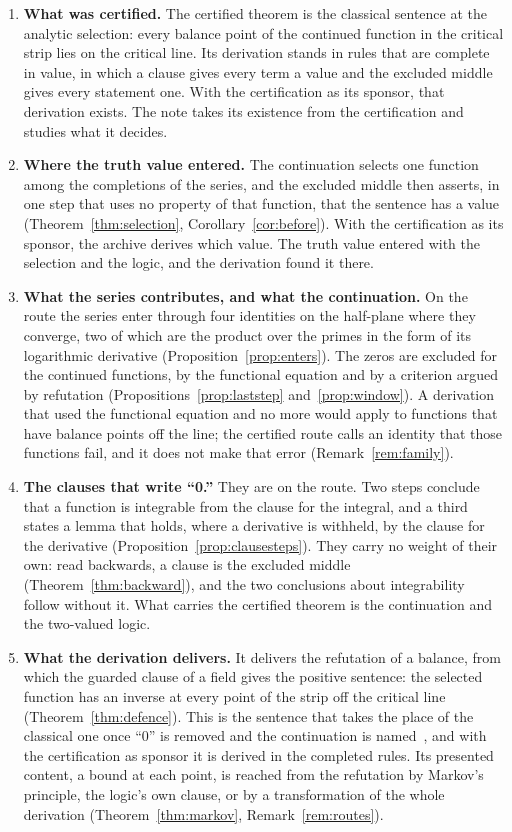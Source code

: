 \documentclass[11pt]{article}
\theoremstyle{definition}
\theoremstyle{remark}
\begin{document}
\begin{enumerate}[leftmargin=2em,itemsep=4pt]
\item \textbf{What was certified.} The certified theorem is the classical sentence at the analytic selection: every balance point of the continued function in the critical strip lies on the critical line. Its derivation stands in rules that are complete in value, in which a clause gives every term a value and the excluded middle gives every statement one. With the certification as its sponsor, that derivation exists. The note takes its existence from the certification and studies what it decides.

\item \textbf{Where the truth value entered.} The continuation selects one function among the completions of the series, and the excluded middle then asserts, in one step that uses no property of that function, that the sentence has a value (Theorem~\ref{thm:selection}, Corollary~\ref{cor:before}). With the certification as its sponsor, the archive derives which value. The truth value entered with the selection and the logic, and the derivation found it there.

\item \textbf{What the series contributes, and what the continuation.} On the route the series enter through four identities on the half-plane where they converge, two of which are the product over the primes in the form of its logarithmic derivative (Proposition~\ref{prop:enters}). The zeros are excluded for the continued functions, by the functional equation and by a criterion argued by refutation (Propositions~\ref{prop:laststep} and~\ref{prop:window}). A derivation that used the functional equation and no more would apply to functions that have balance points off the line; the certified route calls an identity that those functions fail, and it does not make that error (Remark~\ref{rem:family}).

\item \textbf{The clauses that write ``0.''} They are on the route. Two steps conclude that a function is integrable from the clause for the integral, and a third states a lemma that holds, where a derivative is withheld, by the clause for the derivative (Proposition~\ref{prop:clausesteps}). They carry no weight of their own: read backwards, a clause is the excluded middle (Theorem~\ref{thm:backward}), and the two conclusions about integrability follow without it. What carries the certified theorem is the continuation and the two-valued logic.

\item \textbf{What the derivation delivers.} It delivers the refutation of a balance, from which the guarded clause of a field gives the positive sentence: the selected function has an inverse at every point of the strip off the critical line (Theorem~\ref{thm:defence}). This is the sentence that takes the place of the classical one once ``0'' is removed and the continuation is named~\citep{tv}, and with the certification as sponsor it is derived in the completed rules. Its presented content, a bound at each point, is reached from the refutation by Markov's principle, the logic's own clause, or by a transformation of the whole derivation (Theorem~\ref{thm:markov}, Remark~\ref{rem:routes}).


\end{enumerate}
\end{document}
